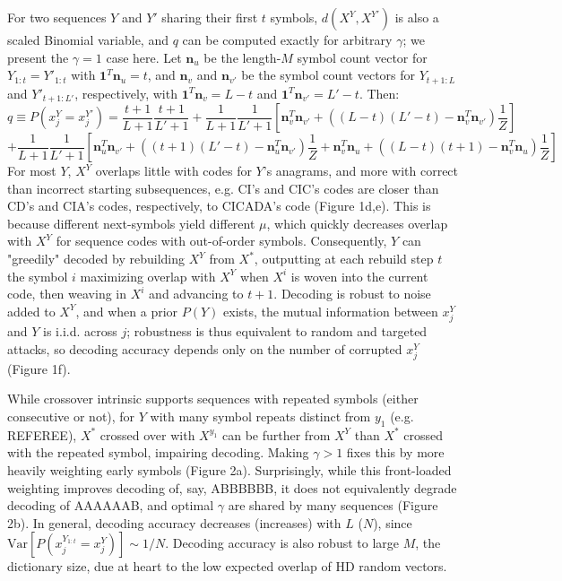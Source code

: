 \documentclass{article}
\begin{document}
For two sequences $Y$ and $Y'$ sharing their first $t$ symbols, $d(X^Y, X^{Y'})$ is also a scaled Binomial variable, and $q$ can be computed exactly for arbitrary $\gamma$; we present the $\gamma = 1$ case here. Let $\mathbf{n}_u$ be the length-$M$ symbol count vector for $Y_{1:t} = Y'_{1:t}$ with $\mathbf{1}^T\mathbf{n}_u = t$, and $\mathbf{n}_v$ and $\mathbf{n}_{v'}$ be the symbol count vectors for $Y_{t+1:L}$ and $Y'_{t+1:L'}$, respectively, with $\mathbf{1}^T\mathbf{n}_{v} = L - t$ and $\mathbf{1}^T\mathbf{n}_{v'} = L' - t$. Then:
$$q \equiv P(x_j^Y = x_j^{Y'}) = \frac{t+1}{L+1}\frac{t+1}{L'+1} + \frac{1}{L+1}\frac{1}{L'+1}\left[\mathbf{n}^T_v\mathbf{n}_{v'} + \left((L-t)(L'-t) - \mathbf{n}^T_v\mathbf{n}_{v'} \right)\frac{1}{Z}\right]$$
$$+\frac{1}{L+1}\frac{1}{L'+1}\left[
\mathbf{n}^T_{u}\mathbf{n}_{v'} + \left((t+1)(L'-t) - \mathbf{n}^T_{u}\mathbf{n}_{v'} \right)\frac{1}{Z}
+ \mathbf{n}^T_{v}\mathbf{n}_{u} + \left((L-t)(t+1) - \mathbf{n}^T_{v}\mathbf{n}_{u} \right)\frac{1}{Z}
\right]$$
For most $Y$, $X^Y$ overlaps little with codes for $Y$'s anagrams, and more with correct than incorrect starting subsequences, e.g. CI's and CIC's codes are closer than CD's and CIA's codes, respectively, to CICADA's code (Figure 1d,e). This is because different next-symbols yield different $\mu$, which quickly decreases overlap with $X^Y$ for sequence codes with out-of-order symbols. Consequently, $Y$ can "greedily" decoded by rebuilding $X^Y$ from $X^*$, outputting at each rebuild step $t$ the symbol $i$ maximizing overlap with $X^Y$ when $X^i$ is woven into the current code, then weaving in $X^i$ and advancing to $t+1$. Decoding is robust to noise added to $X^Y$, and when a prior $P(Y)$ exists, the mutual information between $x_j^Y$ and $Y$ is i.i.d. across $j$; robustness is thus equivalent to random and targeted attacks, so decoding accuracy depends only on the number of corrupted $x_j^Y$ (Figure 1f).

While crossover intrinsic supports sequences with repeated symbols (either consecutive or not), for $Y$ with many symbol repeats distinct from $y_1$ (e.g. REFEREE), $X^*$ crossed over with $X^{y_1}$ can be further from $X^Y$ than $X^*$ crossed with the repeated symbol, impairing decoding. Making $\gamma > 1$ fixes this by more heavily weighting early symbols (Figure 2a). Surprisingly, while this front-loaded weighting improves decoding of, say, ABBBBBB, it does not equivalently degrade decoding of AAAAAAB, and optimal $\gamma$ are shared by many sequences (Figure 2b). In general, decoding accuracy decreases (increases) with $L$ ($N$), since $\textrm{Var}[P(x_j^{Y_{1:t}} = x_j^Y)] \sim 1/N$. Decoding accuracy is also robust to large $M$, the dictionary size, due at heart to the low expected overlap of HD random vectors.
\end{document}
